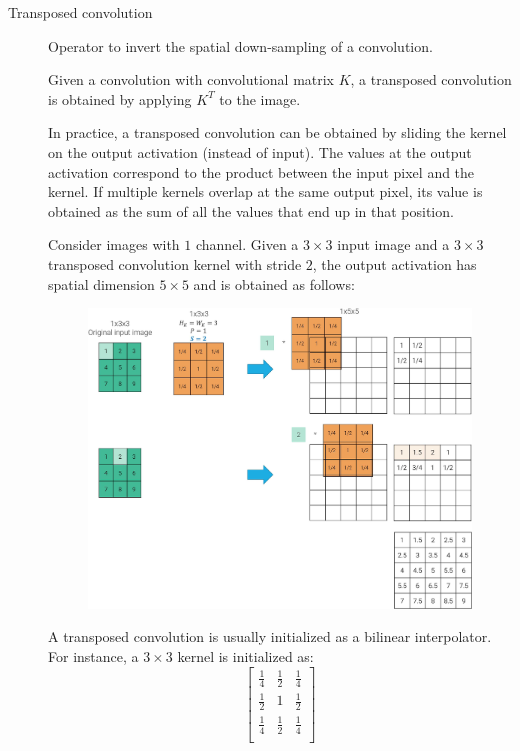 \begin{description}
    \item[Transposed convolution] 
        Operator to invert the spatial down-sampling of a convolution.

        Given a convolution with convolutional matrix $K$, a transposed convolution is obtained by applying $K^T$ to the image.

        In practice, a transposed convolution can be obtained by sliding the kernel on the output activation (instead of input). The values at the output activation correspond to the product between the input pixel and the kernel. If multiple kernels overlap at the same output pixel, its value is obtained as the sum of all the values that end up in that position.

        \begin{example}
            Consider images with $1$ channel. Given a $3 \times 3$ input image and a $3 \times 3$ transposed convolution kernel with stride $2$, the output activation has spatial dimension $5 \times 5$ and is obtained as follows:
            \begin{figure}[H]
                \centering
                \includegraphics[width=0.9\linewidth]{./img/_transposed_convolution.jpg}
            \end{figure}
        \end{example}

        \begin{remark}
            A transposed convolution is usually initialized as a bilinear interpolator. For instance, a $3 \times 3$ kernel is initialized as:
            \[ 
                \begin{bmatrix}
                    \frac{1}{4} & \frac{1}{2} & \frac{1}{4} \\
                    \frac{1}{2} & 1 & \frac{1}{2} \\
                    \frac{1}{4} & \frac{1}{2} & \frac{1}{4} \\
                \end{bmatrix}
            \]
        \end{remark}


\end{description}
